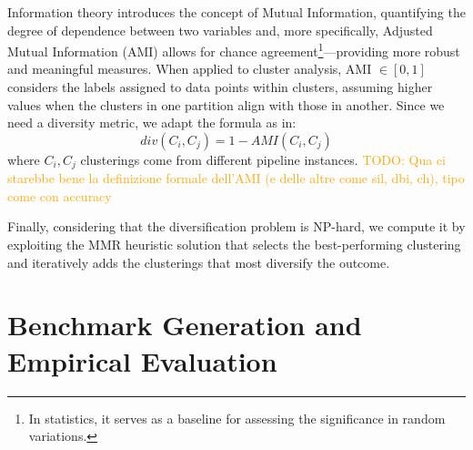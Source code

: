 Information theory introduces the concept of Mutual Information, quantifying the degree of dependence between two variables and, more specifically, Adjusted Mutual Information (AMI) allows for chance agreement\footnote{In statistics, it serves as a baseline for assessing the significance in random variations.}---providing more robust and meaningful measures.
When applied to cluster analysis, AMI $\in [0, 1]$ considers the labels assigned to data points within clusters, assuming higher values when the clusters in one partition align with those in another.
Since we need a diversity metric, we adapt the formula as in:
$$div(C_i, C_j) = 1- AMI(C_i, C_j)$$
where $C_i, C_j$ clusterings come from different pipeline instances.
\textcolor{orange}{TODO: Qua ci starebbe bene la definizione formale dell'AMI (e delle altre come sil, dbi, ch), tipo come con accuracy}

Finally, considering that the diversification problem is NP-hard, we compute it by exploiting the MMR heuristic solution \cite{vieira2011query} that selects the best-performing clustering and iteratively adds the clusterings that most diversify the outcome.

\section{Benchmark Generation and Empirical Evaluation}\label{clustering-sec:test}


